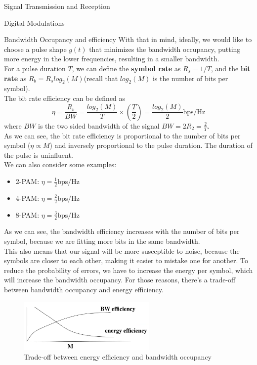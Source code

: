 \begin{section}{Signal Transmission and Reception}
\begin{subsection}{Digital Modulations}
\begin{subsubsection}{Bandwidth Occupancy and efficiency}
      With that in mind, ideally, we would like to choose a pulse shape $g(t)$ that minimizes the
      bandwidth occupancy, putting more energy in the lower frequencies, resulting in a smaller
      bandwidth.\\

      For a pulse duration $T$, we can define the \textbf{symbol rate} as $R_s=1/T$, and the
      \textbf{bit rate} as $R_b=R_s log_2(M)$(recall that $log_2(M)$ is the number of bits per
      symbol).\\
      The bit rate efficiency can be defined as
      \begin{equation}
        \eta=\frac{R_b}{BW}=\frac{log_2(M)}{T} \times (\frac{T}{2})=\frac{log_2(M)}{2}\text{bps/Hz}
      \end{equation}
      where $BW$ is the two sided bandwidth of the signal $BW=2R_2=\frac{2}{T}$.\\
      As we can see, the bit rate efficiency is proportional to the number of bits per symbol
      ($\eta \propto M$) and inversely proportional to the pulse duration. The duration of the 
      pulse is uninfluent.\\

      We can also consider some examples:
      \begin{itemize}
        \item 2-PAM: $\eta=\frac{1}{2}\text{bps/Hz}$
        \item 4-PAM: $\eta=\frac{2}{2}\text{bps/Hz}$
        \item 8-PAM: $\eta=\frac{3}{2}\text{bps/Hz}$
      \end{itemize}
      As we can see, the bandwidth efficiency increases with the number of bits per symbol, because
      we are fitting more bits in the same bandwidth.\\
      This also means that our signal will be more susceptible to noise, because the symbols are
      closer to each other, making it easier to mistake one for another. To reduce the probability
      of errors, we have to increase the energy per symbol, which will increase the bandwidth
      occupancy. For those reasons, there's a trade-off between bandwidth occupancy and energy
      efficiency.\\

      \begin{figure}[h]
        \centering
        \includegraphics[width=0.6\textwidth]{img/wireless/energy efficiency vs bandwidth occupancy.png}
        \caption{Trade-off between energy efficiency and bandwidth occupancy}
        \label{fig:energy efficiency vs bandwidth occupancy}
      \end{figure}


\end{subsubsection}
\end{subsection}
\end{section}
